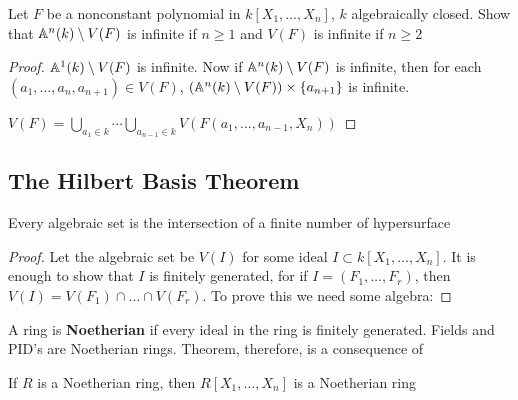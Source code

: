 \documentclass[11pt]{article}
\begin{document}
\begin{exercise}
\label{ex1.14}
Let \(F\) be a nonconstant polynomial in \(k[X_1,\dots,X_n]\), \(k\) algebraically closed. Show
that \(\mathbb{A}^n(k)\setminus V(F)\) is infinite if \(n\ge 1\) and \(V(F)\) is infinite if \(n\ge 2\)
\end{exercise}

\begin{proof}
\(\mathbb{A}^1(k)\setminus V(F)\) is infinite. Now if \(\mathbb{A}^n(k)\setminus V(F)\) is infinite, then for
each \((a_1,\dots,a_n,a_{n+1})\in V(F)\), \((\mathbb{A}^n(k)\setminus V(F))\times\{a_{n+1}\}\) is infinite.

\(V(F)=\bigcup_{a_1\in k}\cdots\bigcup_{a_{n-1}\in k}V(F(a_1,\dots,a_{n-1},X_n))\)
\end{proof}
\subsection{The Hilbert Basis Theorem}
\label{sec:org759651b}
\begin{theorem}[]
Every algebraic set is the intersection of a finite number of hypersurface
\end{theorem}

\begin{proof}
Let the algebraic set be \(V(I)\) for some ideal \(I\subset k[X_1,\dots,X_n]\). It is enough to show
that \(I\) is finitely generated, for if \(I=(F_1,\dots,F_r)\), then \(V(I)=V(F_1)\cap\dots\cap V(F_r)\). To prove
this we need some algebra:
\end{proof}

A ring is \textbf{Noetherian} if every ideal in the ring is finitely generated. Fields and PID's are
Noetherian rings. Theorem, therefore, is a consequence of

\begin{theorem}
If \(R\) is a Noetherian ring, then \(R[X_1,\dots,X_n]\) is a Noetherian ring
\end{theorem}
\end{document}

